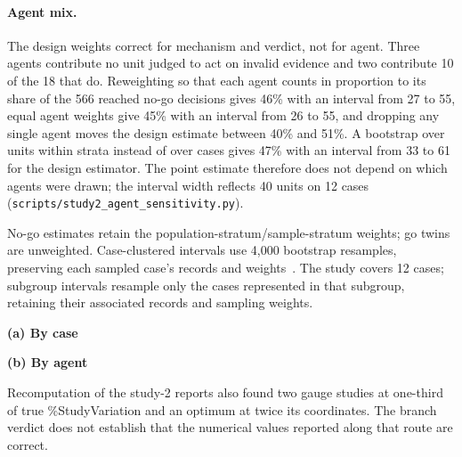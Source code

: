 \documentclass{article}
\newcommand{\tablepanel}[1]{\par\smallskip\noindent\textbf{#1}\par\nobreak\smallskip}
\begin{document}
\paragraph{Agent mix.} The design weights correct for mechanism and verdict, not for agent. Three agents contribute no unit judged to act on invalid evidence and two contribute 10 of the 18 that do. Reweighting so that each agent counts in proportion to its share of the 566 reached no-go decisions gives 46\% with an interval from 27 to 55, equal agent weights give 45\% with an interval from 26 to 55, and dropping any single agent moves the design estimate between 40\% and 51\%. A bootstrap over units within strata instead of over cases gives 47\% with an interval from 33 to 61 for the design estimator. The point estimate therefore does not depend on which agents were drawn; the interval width reflects 40 units on 12 cases (\nolinkurl{scripts/study2_agent_sensitivity.py}).

No-go estimates retain the population-stratum/sample-stratum weights; go twins are
unweighted. Case-clustered intervals use 4,000 bootstrap resamples, preserving each
sampled case's records and weights~\citep{field2007clusterbootstrap}. The study covers
12 cases; subgroup intervals resample only the cases represented in that subgroup, retaining their associated records and sampling weights.

\begin{table}[!htbp]
\caption{The \sTwoN{} study-2 units by case (a) and by agent (b): no-go units and
how many the majority read as acting on the invalid evidence; go twins and how many
over-claimed. Unweighted counts.}
\label{tab:study2dist}
\centering
\footnotesize
\tablepanel{(a) By case}

\tablepanel{(b) By agent}


\end{table}

Recomputation of the study-2 reports also found two gauge studies at one-third of true \%StudyVariation and an optimum at twice its coordinates. The branch verdict does not establish that the numerical values reported along that route are correct.
\end{document}
